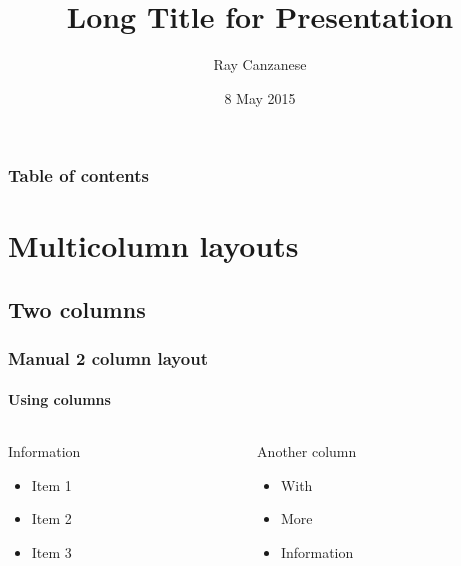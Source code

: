 \documentclass[sans,10pt]{beamer}
\title[Short Title]
{Long Title for Presentation}
\author[R. Canzanese]
{Ray Canzanese}
\institute[Drexel]
{Dept. of Electrical and Computer Engineering\\
Drexel University}
\date[8 May 2015]
{8 May 2015}
\begin{document}

\frame{\titlepage}


\begin{frame}
\frametitle{Table of contents}
\tableofcontents[hideallsubsections]
\end{frame}

\section{Multicolumn layouts}

\expandedtoc{}

\subsection{Two columns}

\begin{frame}
\frametitle{Manual 2 column layout}
\framesubtitle{Using columns}
\begin{columns}[onlytextwidth,t]
\begin{column}{.5\linewidth}
Information
\begin{itemize}
\item Item 1 
\item Item 2
\item Item 3 
\end{itemize}
\end{column}
\begin{column}{.5\linewidth}
Another column
\begin{itemize}
\item With
\item More
\item Information
\end{itemize}
\end{column}
\end{columns}
\end{frame}

\end{document}
